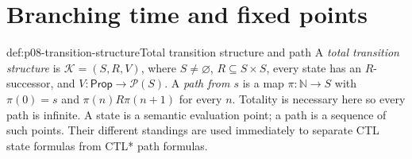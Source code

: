 \section{Branching time and fixed points}

\begin{hbdefinition}{def:p08-transition-structure}{Total transition structure and path}
A \emph{total transition structure} is
\(\mathcal K=(S,R,V)\), where \(S\ne\varnothing\),
\(R\subseteq S\times S\), every state has an \(R\)-successor, and
\(V:\mathsf{Prop}\to\mathcal P(S)\).  A \emph{path from \(s\)} is a map
\(\pi:\mathbb N\to S\) with \(\pi(0)=s\) and
\(\pi(n)R\pi(n+1)\) for every \(n\).  Totality is necessary here so every
path is infinite.  A state is a semantic evaluation point; a path is a
sequence of such points.  Their different standings are used immediately to
separate CTL state formulas from CTL* path formulas.
\end{hbdefinition}

